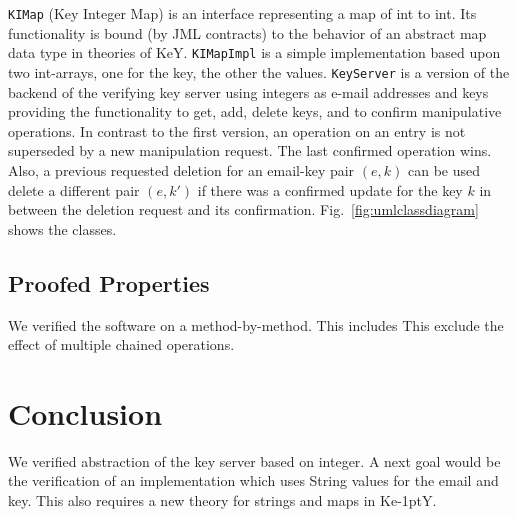 \documentclass{llncs}
\newcommand{\KeY}{Ke\kern-1ptY\xspace}
\begin{document}
\texttt{KIMap} (Key Integer Map) is an interface representing a map of int to
int. Its functionality is bound (by JML contracts) to the behavior of an
abstract map data type in theories of KeY. \texttt{KIMapImpl} is a simple
implementation based upon two int-arrays, one for the key, the other the values.
%
\texttt{KeyServer} is a version of the backend of the verifying key server using
integers as e-mail addresses and keys providing the functionality to get, add,
delete keys, and to confirm manipulative operations.
%
In contrast to the first version, an operation on an entry is not superseded by
a new manipulation request. The last confirmed operation wins. Also, a previous
requested deletion for an email-key pair $(e,k)$ can be used delete a different
pair $(e,k')$ if there was a confirmed update for the key $k$ in between the
deletion request and its confirmation.
%
Fig.~\ref{fig:umlclassdiagram} shows the classes.

\subsection*{Proofed Properties}

We verified the software on a method-by-method.
%
This includes
%
This exclude the effect of multiple chained operations. 

\section{Conclusion }

We verified abstraction of the key server based on integer.
%
A next goal would be the verification of an implementation which uses String
values for the email and key. This also requires a new theory for strings and
maps in \KeY.
%
%
\end{document}
